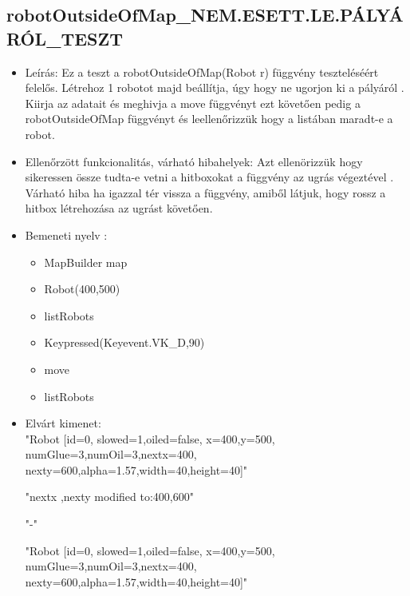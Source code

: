 \subsection{robotOutsideOfMap\_NEM.ESETT.LE.PÁLYÁRÓL\_TESZT}
\begin{itemize}
	\item Leírás: Ez a teszt a robotOutsideOfMap(Robot r) függvény teszteléséért felelős.
			Létrehoz 1 robotot majd beállítja, úgy hogy ne ugorjon ki a pályáról .
			Kiirja az adatait  és meghivja a move függvényt ezt követően pedig a robotOutsideOfMap függvényt és leellenőrizzük hogy a listában maradt-e             a robot.\newline
	\item Ellenőrzött funkcionalitás, várható hibahelyek: Azt ellenörizzük hogy sikeressen össze tudta-e vetni a hitboxokat a függvény az ugrás                     végeztével .
	        Várható hiba ha igazzal tér vissza a függvény, amiből látjuk, hogy rossz a hitbox létrehozása  az ugrást követően.
	\item Bemeneti nyelv :
		\begin{itemize}
\item MapBuilder map
		\item Robot(400,500)
		\item listRobots
		\item Keypressed(Keyevent.VK\_D,90)
		\item move
		\item listRobots
		\end{itemize}

	\item Elvárt kimenet: \\
		"Robot [id=0,  slowed=1,oiled=false, x=400,y=500, 
		\\numGlue=3,numOil=3,nextx=400,
		\\nexty=600,alpha=1.57,width=40,height=40]"\newline
		
		"nextx ,nexty modified to:400,600"\newline
		
		"-"\newline
	
		 "Robot [id=0,  slowed=1,oiled=false, x=400,y=500, 
		\\numGlue=3,numOil=3,nextx=400,
		\\nexty=600,alpha=1.57,width=40,height=40]"\newline
	
\end{itemize}


